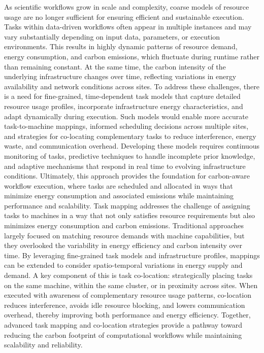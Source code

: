 As scientific workflows grow in scale and complexity, coarse models of resource usage are no longer sufficient for ensuring efficient and sustainable execution. Tasks within data-driven workflows often appear in multiple instances and may vary substantially depending on input data, parameters, or execution environments. This results in highly dynamic patterns of resource demand, energy consumption, and carbon emissions, which fluctuate during runtime rather than remaining constant. At the same time, the carbon intensity of the underlying infrastructure changes over time, reflecting variations in energy availability and network conditions across sites. To address these challenges, there is a need for fine-grained, time-dependent task models that capture detailed resource usage profiles, incorporate infrastructure energy characteristics, and adapt dynamically during execution. Such models would enable more accurate task-to-machine mappings, informed scheduling decisions across multiple sites, and strategies for co-locating complementary tasks to reduce interference, energy waste, and communication overhead. Developing these models requires continuous monitoring of tasks, predictive techniques to handle incomplete prior knowledge, and adaptive mechanisms that respond in real time to evolving infrastructure conditions. Ultimately, this approach provides the foundation for carbon-aware workflow execution, where tasks are scheduled and allocated in ways that minimize energy consumption and associated emissions while maintaining performance and scalability.
Task mapping addresses the challenge of assigning tasks to machines in a way that not only satisfies resource requirements but also minimizes energy consumption and carbon emissions. Traditional approaches largely focused on matching resource demands with machine capabilities, but they overlooked the variability in energy efficiency and carbon intensity over time. By leveraging fine-grained task models and infrastructure profiles, mappings can be extended to consider spatio-temporal variations in energy supply and demand. A key component of this is task co-location: strategically placing tasks on the same machine, within the same cluster, or in proximity across sites. When executed with awareness of complementary resource usage patterns, co-location reduces interference, avoids idle resource blocking, and lowers communication overhead, thereby improving both performance and energy efficiency. Together, advanced task mapping and co-location strategies provide a pathway toward reducing the carbon footprint of computational workflows while maintaining scalability and reliability.

